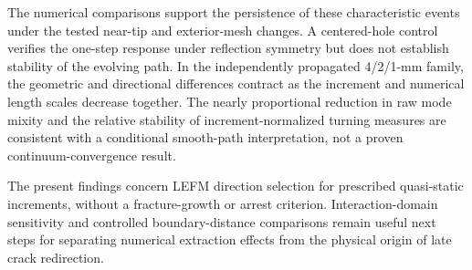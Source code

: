 \documentclass[11pt]{article}
\begin{document}
The numerical comparisons support the persistence of
these characteristic events under the tested
near-tip and exterior-mesh changes. A centered-hole
control verifies the one-step response under reflection
symmetry but does not establish stability of the
evolving path. In the independently propagated
4/2/1-mm family, the geometric and directional
differences contract as the increment and numerical
length scales decrease together. The nearly
proportional reduction in raw mode mixity and the
relative stability of increment-normalized turning
measures are consistent with a conditional smooth-path
interpretation, not a proven continuum-convergence
result.

The present findings concern LEFM direction selection
for prescribed quasi-static increments, without a
fracture-growth or arrest criterion. Interaction-domain
sensitivity and controlled boundary-distance
comparisons remain useful next steps for separating
numerical extraction effects from the physical origin
of late crack redirection.




\clearpage
\appendix
\end{document}
